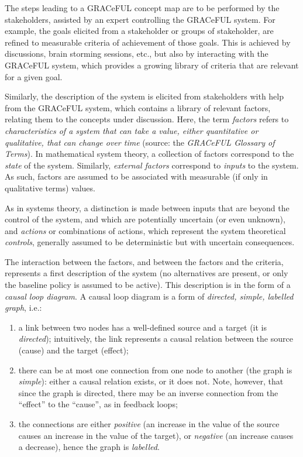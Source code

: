 \documentclass[]{article}
\begin{document}
The steps leading to a GRACeFUL concept map are to be performed by the
stakeholders, assisted by an expert controlling the GRACeFUL system. For
example, the goals elicited from a stakeholder or groups of stakeholder,
are refined to measurable criteria of achievement of those goals. This
is achieved by discussions, brain storming sessions, etc., but also by
interacting with the GRACeFUL system, which provides a growing library
of criteria that are relevant for a given goal.

Similarly, the description of the system is elicited from stakeholders
with help from the GRACeFUL system, which contains a library of relevant
factors, relating them to the concepts under discussion. Here, the term
\emph{factors} refers to \emph{characteristics of a system that can take
a value, either quantitative or qualitative, that can change over time}
(source: the \emph{GRACeFUL Glossary of Terms}). In mathematical system
theory, a collection of factors correspond to the \emph{state} of the
system. Similarly, \emph{external factors} correspond to \emph{inputs}
to the system. As such, factors are assumed to be associated with
measurable (if only in qualitative terms) values.

As in systems theory, a distinction is made between inputs that are
beyond the control of the system, and which are potentially uncertain
(or even unknown), and \emph{actions} or combinations of actions, which
represent the system theoretical \emph{controls}, generally assumed to
be deterministic but with uncertain consequences.

The interaction between the factors, and between the factors and the
criteria, represents a first description of the system (no alternatives
are present, or only the baseline policy is assumed to be active). This
description is in the form of a \emph{causal loop diagram}. A causal
loop diagram is a form of \emph{directed, simple, labelled graph}, i.e.:

\begin{enumerate}
\def\labelenumi{\alph{enumi}.}
\item
  a link between two nodes has a well-defined source and a target (it is
  \emph{directed}); intuitively, the link represents a causal relation
  between the source (cause) and the target (effect);
\item
  there can be at most one connection from one node to another (the
  graph is \emph{simple}): either a causal relation exists, or it does
  not. Note, however, that since the graph is directed, there may be an
  inverse connection from the ``effect'' to the ``cause'', as in
  feedback loops;
\item
  the connections are either \emph{positive} (an increase in the value
  of the source causes an increase in the value of the target), or
  \emph{negative} (an increase causes a decrease), hence the graph is
  \emph{labelled}.
\end{enumerate}
\end{document}
